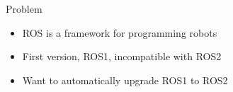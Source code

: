 \documentclass[final]{beamer}
\newlength{\onecolwid}
\begin{document}
\begin{frame}[t]
\begin{columns}[t]
\begin{column}{\onecolwid}
\begin{alertblock}{Problem}
\begin{itemize}
\item ROS is a framework for programming robots
\item First version, ROS1, incompatible with ROS2
\item Want to automatically upgrade ROS1 to ROS2
\end{itemize}

\end{alertblock}





\end{column}
\end{columns}
\end{frame}
\end{document}
